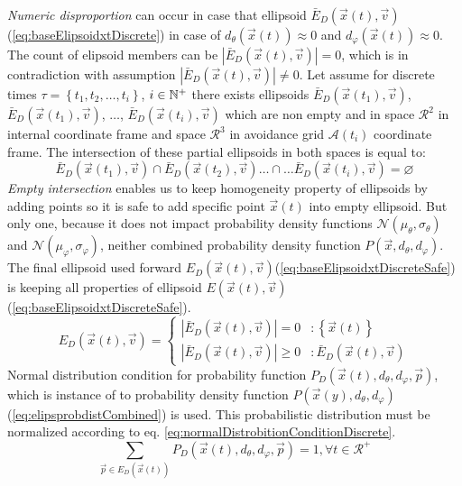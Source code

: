 \noindent \emph{Numeric disproportion} can occur in case that ellipsoid $\bar{E}_D(\vec{x}(t),\vec{v})$ (\ref{eq:baseElipsoidxtDiscrete}) in case of $d_\theta(\vec{x}(t))\approx 0$ and $d_\varphi(\vec{x}(t))\approx 0$. The count of elipsoid members can be $|\bar{E}_D(\vec{x}(t),\vec{v})|=0$, which is in contradiction with assumption $|\bar{E}_D(\vec{x}(t),\vec{v})|\neq 0$. Let assume for discrete times $\tau=\left\{t_1,t_2,\dots,t_i\right\}$, $i\in \mathbb{N}^+$ there exists ellipsoids $\bar{E}_D(\vec{x}(t_1),\vec{v})$,$\bar{E}_D(\vec{x}(t_1),\vec{v})$, $\dots$, $\bar{E}_D(\vec{x}(t_i),\vec{v})$ which are non empty and in space $\mathscr{R}^2$ in internal coordinate frame and space $\mathscr{R}^3$ in avoidance grid $\mathscr{A}(t_i)$ coordinate frame. The intersection of these partial ellipsoids in both spaces is equal to:
\begin{equation}
    \bar{E}_D(\vec{x}(t_1),\vec{v})\cap \bar{E}_D(\vec{x}(t_2),\vec{v})\dots\cap\dots \bar{E}_D(\vec{x}(t_i),\vec{v}) = \varnothing
\end{equation}
\noindent \emph{Empty intersection} enables us to keep homogeneity property of ellipsoids by adding points so it is safe to add specific point $\vec{x}(t)$ into empty ellipsoid. But only one, because it does not impact probability density functions $\mathscr{N}(\mu_\theta,\sigma_\theta)$ and $\mathscr{N}(\mu_\varphi,\sigma_\varphi)$, neither combined probability density function $P(\vec{x},d_\theta,d_\varphi)$. The final ellipsoid used forward $E_D(\vec{x}(t),\vec{v})$(\ref{eq:baseElipsoidxtDiscreteSafe}) is keeping all properties of ellipsoid $E(\vec{x}(t),\vec{v})$ (\ref{eq:baseElipsoidxtDiscreteSafe}). 
\begin{equation}\label{eq:baseElipsoidxtDiscreteSafe}
    E_D(\vec{x}(t),\vec{v})= 
    \begin{cases}
        |\bar{E}_D(\vec{x}(t),\vec{v})|=0 &: \left\{\vec{x}(t)\right\} \\
        |\bar{E}_D(\vec{x}(t),\vec{v})|\ge0 &: \bar{E}_D(\vec{x}(t),\vec{v}) 
    \end{cases}
\end{equation}
\noindent Normal distribution condition for probability function $P_D(\vec{x}(t),d_\theta,d_\varphi,\vec{p})$, which is instance of to probability density function $P(\vec{x}(y),d_\theta,d_\varphi)$ (\ref{eq:elipsprobdistCombined}) is used. This probabilistic distribution must be normalized according to eq.  \ref{eq:normalDistrobitionConditionDiscrete}. 
\begin{equation}\label{eq:normalDistrobitionConditionDiscrete}
    \sum_{\vec{p} \in E_D(\vec{x}(t))} P_D(\vec{x}(t),d_\theta,d_\varphi,\vec{p}) = 1,\forall t\in\mathscr{R}^+
\end{equation}
